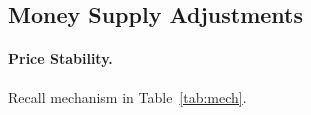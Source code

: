 %
%
%

\subsection{Money Supply Adjustments}
\label{sec:elastic}

\paragraph{Price Stability.} Recall mechanism in Table~\ref{tab:mech}.

